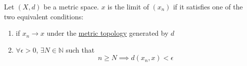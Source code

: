   \begin{theorem}
    \label{thm:convergence-of-sequence-in-metric-space}
    Let $(X, d)$ be a metric space. $x$ is the limit of $(x_n)$ if it satisfies one of the two equivalent conditions: 
    \begin{enumerate}
      \item if $x_n \to x$ under the \hyperref[def:metric-topology]{metric topology} generated by $d$
      \item $\forall \epsilon > 0$, $\exists N \in \mathbb{N}$ such that
      \begin{equation}
        n \geq N \implies d(x_n, x) < \epsilon 
      \end{equation}
    \end{enumerate}
  \end{theorem}

